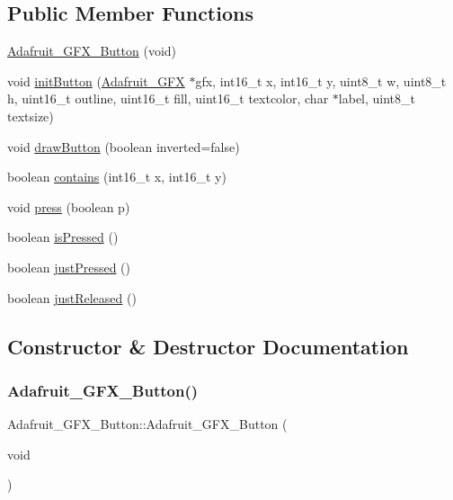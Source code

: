 \subsection*{Public Member Functions}
\begin{DoxyCompactItemize}
\item 
\hyperlink{class_adafruit___g_f_x___button_a2232fef797e2d21f931eeda59d790d09}{Adafruit\+\_\+\+G\+F\+X\+\_\+\+Button} (void)
\item 
void \hyperlink{class_adafruit___g_f_x___button_a9c5cb82000fcba9b660a86e08a669e07}{init\+Button} (\hyperlink{class_adafruit___g_f_x}{Adafruit\+\_\+\+G\+FX} $\ast$gfx, int16\+\_\+t x, int16\+\_\+t y, uint8\+\_\+t w, uint8\+\_\+t h, uint16\+\_\+t outline, uint16\+\_\+t fill, uint16\+\_\+t textcolor, char $\ast$label, uint8\+\_\+t textsize)
\item 
void \hyperlink{class_adafruit___g_f_x___button_a1d9329970f085c5111e239be90005371}{draw\+Button} (boolean inverted=false)
\item 
boolean \hyperlink{class_adafruit___g_f_x___button_aa5fb594cf6f9cd4c1815a7c1011b5830}{contains} (int16\+\_\+t x, int16\+\_\+t y)
\item 
void \hyperlink{class_adafruit___g_f_x___button_a221d9753f7d8e8f7f9c1ebbee69d02bd}{press} (boolean p)
\item 
boolean \hyperlink{class_adafruit___g_f_x___button_a1faefaf249e868786a416bc097e2cf07}{is\+Pressed} ()
\item 
boolean \hyperlink{class_adafruit___g_f_x___button_a41bcfc81edaf30a11d171a69e7e7c679}{just\+Pressed} ()
\item 
boolean \hyperlink{class_adafruit___g_f_x___button_a8a139332b95997168ba0da37973d2887}{just\+Released} ()
\end{DoxyCompactItemize}


\subsection{Constructor \& Destructor Documentation}
\mbox{\label{class_adafruit___g_f_x___button_a2232fef797e2d21f931eeda59d790d09}} 
\subsubsection{\texorpdfstring{Adafruit\+\_\+\+G\+F\+X\+\_\+\+Button()}{Adafruit\_GFX\_Button()}}
{\footnotesize\ttfamily Adafruit\+\_\+\+G\+F\+X\+\_\+\+Button\+::\+Adafruit\+\_\+\+G\+F\+X\+\_\+\+Button (\begin{DoxyParamCaption}\item[{void}]{ }\end{DoxyParamCaption})}



